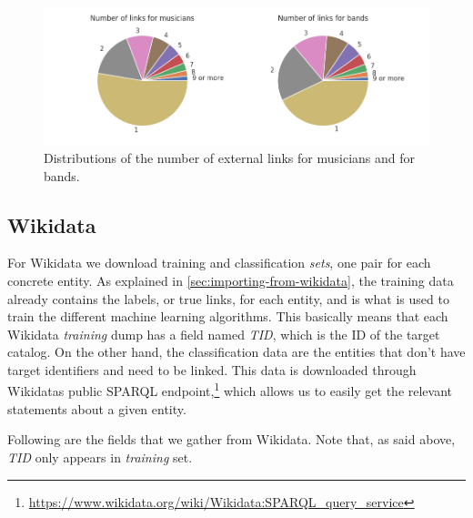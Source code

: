 \documentclass[epsfig,a4paper,11pt,titlepage,twoside,openany]{book}
\newcommand{\footurl}[1]{\footnote{\url{#1}}}
\begin{document}
\begin{figure}[]
  \centering \includegraphics[width=\textwidth]{musicbrainz_number_of_links_musician_band} 
  \caption{Distributions of the number of external links for musicians and for bands.}
  \label{fig:musicbrainz-links-number-pie}
\end{figure}


\subsection{Wikidata}
\label{sec:shape-wikidata}


For Wikidata we download training and classification \textit{sets}, one pair for each concrete entity. As explained in \autoref{sec:importing-from-wikidata}, the training data already contains the labels, or true links, for each entity, and is what is used to train the different machine learning algorithms. This basically means that each Wikidata \textit{training} dump has a field named \textit{TID}, which is the ID of the target catalog. On the other hand, the classification data are the entities that don't have target identifiers and need to be linked. This data is downloaded through Wikidatas public SPARQL endpoint,\footurl{https://www.wikidata.org/wiki/Wikidata:SPARQL_query_service} which allows us to easily get the relevant statements about a given entity.

Following are the fields that we gather from Wikidata. Note that, as said above, \textit{TID} only appears in \textit{training} set. 
\end{document}
